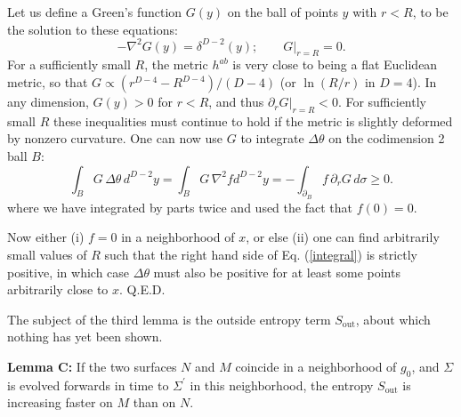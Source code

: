 \documentclass{article}
\begin{document}
Let us define a Green's function $G(y)$ on the ball of points $y$ with $r < R$, to be the solution to these equations:
\begin{equation}
-\nabla^2 G(y) = \delta^{D-2}(y); \qquad G|_{r=R} = 0.
\end{equation}
For a sufficiently small $R$, the metric $h^{ab}$ is very close to being a flat Euclidean metric, so that $G \propto (r^{D-4} - R^{D-4})/(D-4)$ (or $\ln(R/r)$ in $D = 4$).  In any dimension, $G(y) > 0$ for $r < R$, and thus $\partial_r G|_{r=R} < 0$.  For sufficiently small $R$ these inequalities must continue to hold if the metric is slightly deformed by nonzero curvature.  One can now use $G$ to integrate $\Delta \theta$ on the codimension 2 ball $B$:
\begin{equation}\label{integral}
\int_B G\,\Delta \theta\,d^{D-2}y = \int_B G\,\nabla^2 f d^{D-2}y
= -\int_{\partial_B} f\,\partial_r G \,d\sigma\ge 0.
\end{equation}
where we have integrated by parts twice and used the fact that $f(0) = 0$.  

Now either (i) $f = 0$ in a neighborhood of $x$, or else (ii) one can find arbitrarily small values of $R$ such that the right hand side of Eq. (\ref{integral}) is strictly positive, in which case $\Delta \theta$ must also be positive for at least some points arbitrarily close to $x$.  Q.E.D.


The subject of the third lemma is the outside entropy term $S_\mathrm{out}$, about which nothing has yet been shown.

\textbf{Lemma C:} If the two surfaces $N$ and $M$ coincide in a neighborhood of $g_0$, and $\Sigma$ is evolved forwards in time to $\Sigma^\prime$ in this neighborhood, the entropy $S_\mathrm{out}$ is increasing faster on $M$ than on $N$.
\end{document}
